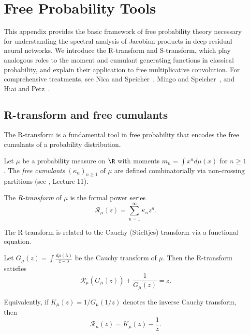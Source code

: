 
\section{Free Probability Tools}\label{app:free-prob}

This appendix provides the basic framework of free probability theory necessary for understanding the spectral analysis of Jacobian products in deep residual neural networks. We introduce the R-transform and S-transform, which play analogous roles to the moment and cumulant generating functions in classical probability, and explain their application to free multiplicative convolution. For comprehensive treatments, see Nica and Speicher~\cite{nica2006lectures}, Mingo and Speicher~\cite{mingo2017free}, and Hiai and Petz~\cite{hiai2000semicircle}.

\subsection{R-transform and free cumulants}

The R-transform is a fundamental tool in free probability that encodes the free cumulants of a probability distribution.

\begin{definition}\label{def:r-transform}
Let $\mu$ be a probability measure on $\R$ with moments $m_n = \int x^n d\mu(x)$ for $n \geq 1$. The \emph{free cumulants} $(\kappa_n)_{n \geq 1}$ of $\mu$ are defined combinatorially via non-crossing partitions (see \cite{nica2006lectures}, Lecture 11).

The \emph{R-transform} of $\mu$ is the formal power series
\begin{equation}\label{eq:r-transform-def}
\mathcal{R}_\mu(z) = \sum_{n=1}^\infty \kappa_n z^n.
\end{equation}
\end{definition}

The R-transform is related to the Cauchy (Stieltjes) transform via a functional equation.

\begin{proposition}\label{prop:r-cauchy-relation}
Let $G_\mu(z) = \int \frac{d\mu(\lambda)}{z - \lambda}$ be the Cauchy transform of $\mu$. Then the R-transform satisfies
\begin{equation}\label{eq:r-functional}
\mathcal{R}_\mu(G_\mu(z)) + \frac{1}{G_\mu(z)} = z.
\end{equation}

Equivalently, if $K_\mu(z) = 1/G_\mu(1/z)$ denotes the inverse Cauchy transform, then
\begin{equation}
\mathcal{R}_\mu(z) = K_\mu(z) - \frac{1}{z}.
\end{equation}
\end{proposition}

